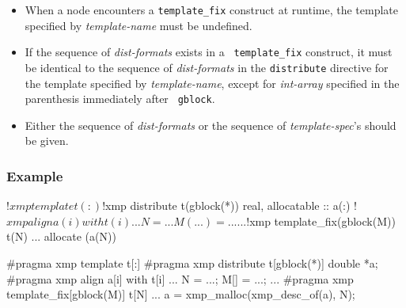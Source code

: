 \begin{itemize}
\item When a node encounters a {\tt template\_fix} construct at runtime,
      the template specified by {\it template-name} must be undefined.
\item If the sequence of {\it dist-formats} exists in a {\tt
      template\_fix} construct, it must be identical to the 
      sequence of {\it dist-formats} in the {\tt distribute} directive
      for the template specified by {\it template-name}, except for {\it
      int-array} specified in the parenthesis immediately after {\tt
      gblock}.
\item Either the sequence of {\it dist-formats} or the sequence of {\it
      template-spec}'s should be given.
\end{itemize}

\subsubsection*{Example}

\vspace{0.5cm}
\begin{minipage}{0.45\hsize}
\begin{center}
\begin{XFexample}
!$xmp template t(:)
!$xmp distribute t(gblock(*))
real, allocatable :: a(:)
!$xmp align a(i) with t(i)
...
N = ...
M(...) = ...
...
!$xmp template_fix(gblock(M)) t(N)
...
allocate (a(N))
\end{XFexample}
\end{center}
\end{minipage}
%
\begin{minipage}{0.52\hsize}
\begin{center}
\begin{XCexampleR}
#pragma xmp template t[:]
#pragma xmp distribute t[gblock(*)]
double *a;
#pragma xmp align a[i] with t[i]
...
N = ...;
M[] = {...};
...
#pragma xmp template_fix[gblock(M)] t[N]
...
a = xmp_malloc(xmp_desc_of(a), N);
\end{XCexampleR}
\end{center}
\end{minipage}


